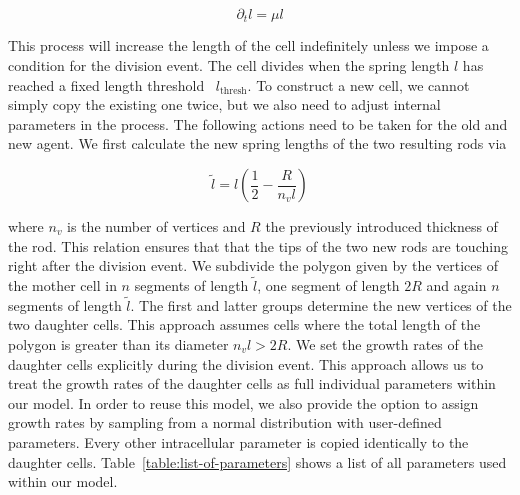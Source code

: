 \documentclass[10pt,letterpaper]{article}
\begin{document}
\begin{equation}
    \partial_t l = \mu l
\end{equation}

This process will increase the length of the cell indefinitely unless we impose a condition for the
division event.
The cell divides when the spring length $l$ has reached a fixed length threshold~\cite{Robert2014}
$l_\text{thresh}$.
To construct a new cell, we cannot simply copy the existing one twice, but we also need to adjust
internal parameters in the process.
The following actions need to be taken for the old and new agent.
We first calculate the new spring lengths of the two resulting rods via

\begin{equation}
    \tilde{l} = l\left(\frac{1}{2} - \frac{R}{n_v l}\right)
\end{equation}

where $n_v$ is the number of vertices and $R$ the previously introduced thickness of the rod.
This relation ensures that that the tips of the two new rods are touching right after the division
event.
We subdivide the polygon given by the vertices of the mother cell in $n$ segments of length
$\tilde{l}$, one segment of length $2R$ and again $n$ segments of length $\tilde{l}$.
The first and latter groups determine the new vertices of the two daughter cells.
This approach assumes cells where the total length of the polygon is greater than its diameter
$n_vl>2R$.
We set the growth rates of the daughter cells explicitly during the division event.
This approach allows us to treat the growth rates of the daughter cells as full individual
parameters within our model.
In order to reuse this model, we also provide the option to assign growth rates by sampling from a
normal distribution with user-defined parameters.
Every other intracellular parameter is copied identically to the daughter cells.
Table~\ref{table:list-of-parameters} shows a list of all parameters used within our model.
\end{document}
